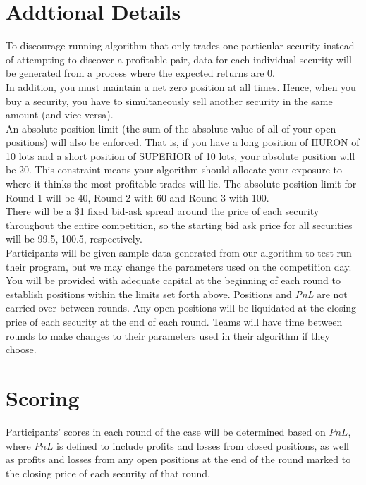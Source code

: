 \documentclass{amsart}
\renewcommand{\_}[1]{\underline{ #1 }}
\theoremstyle{definition}
\numberwithin{equation}{subsection}
\begin{document}
\section{Addtional Details}
To discourage running algorithm that only trades one particular security instead of attempting to discover a profitable pair, data for each individual security will be generated from a process where the expected returns are 0.
\\

In addition, you must maintain a net zero position at all times. Hence, when you buy a security, you have to simultaneously sell another security in the same amount (and vice versa). \\

An absolute position limit (the sum of the absolute value of all of your open positions) will also be enforced. That is, if you have a long position of HURON of 10 lots and a short position of SUPERIOR of 10 lots, your absolute position will be 20. This constraint means your algorithm should allocate your exposure to where it thinks the most profitable trades will lie. The absolute position limit for Round 1 will be 40, Round 2 with 60 and Round 3 with 100.\\
 


There will be a $\$$1 fixed bid-ask spread around the price of each security throughout the entire competition, so the starting bid ask price for all securities will be 99.5, 100.5, respectively.\\

Participants will be given sample data generated from our algorithm to test run their program, but we may change the parameters used on the competition day.  You will be provided with adequate capital at the beginning of each round to establish positions within the limits set forth above. Positions and {\it PnL} are not carried over between rounds. Any open positions will be liquidated at the closing price of each security at the end of each round. Teams will have time between rounds to make changes to their parameters used in their algorithm if they choose.  

\section{Scoring}
Participants' scores in each round of the case will be determined based on $PnL$, where $PnL$ is defined to include profits and losses from closed positions, as well as profits and losses from any open positions at the end of the round marked to the closing price of each security of that round. 
\\
\end{document}
